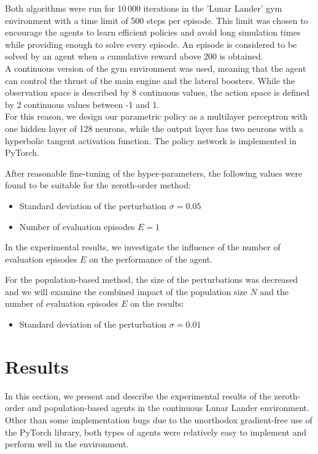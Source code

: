 \documentclass[10pt]{article}
\begin{document}
Both algorithms were run for 10\,000 iterations in the 'Lunar Lander' gym environment
with a time limit of 500 steps per episode.
This limit was chosen to encourage the agents to learn efficient policies and avoid long
simulation times while providing enough to solve every episode.
An episode is considered to be solved by an agent when a cumulative reward above 200 is
obtained.\\
A continuous version of the gym environment was used, meaning that the agent can control
the thrust of the main engine and the lateral boosters.
While the observation space is described by 8 continuous values, the action space is
defined by 2 continuous values between -1 and 1.
\cite{gym}\\
For this reason, we design our parametric policy as a multilayer perceptron with one
hidden layer of 128 neurons, while the output layer has two neurons with a hyperbolic
tangent activation function.
The policy network is implemented in PyTorch.
\cite{pytorch}

After reasonable fine-tuning of the hyper-parameters, the following values were found to
be suitable for the zeroth-order method:
\begin{itemize}
    \item Standard deviation of the
          perturbation $\sigma=0.05$
    \item Number of evaluation episodes $E = 1$
\end{itemize} In
the experimental results, we investigate the influence of the number of evaluation
episodes $E$ on the performance of the agent.

For the population-based method, the size of the perturbations was decreased and we will
examine the combined impact of the population size $N$ and the number of evaluation
episodes $E$ on the results:
\begin{itemize}
    \item Standard deviation of the perturbation
          $\sigma=0.01$
\end{itemize}

\section{Results}

In
this section, we present and describe the experimental results of the zeroth-order and
population-based agents in the continuous Lunar Lander environment.
Other than some implementation bugs due to the unorthodox gradient-free use of the
PyTorch library, both types of agents were relatively easy to implement and perform well
in the environment.
\end{document}
